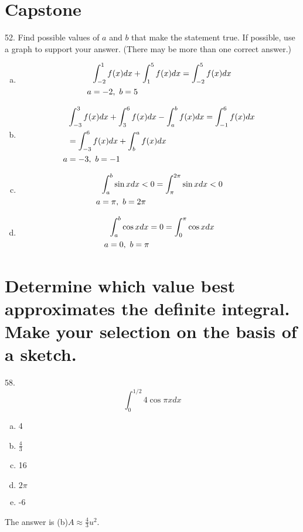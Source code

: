 \documentclass[11pt]{article}
\newcommand*{\set}{\setcounter{equation}{0}}
\begin{document}
\section{Capstone}
52. Find possible values of $a$ and $b$ that make the statement
true. If possible, use a graph to support your answer. (There
may be more than one correct answer.)
\begin{enumerate}[(a)]
    \item
        \begin{align}
            \set
            &\int_{-2}^{1}f(x)dx+\int_{1}^{5}f(x)dx=\int_{-2}^{5}f(x)dx\\
            a&=-2,\,\, b=5
        \end{align}
    \item
        \begin{align}
            \set
            &\int_{-3}^{3}f(x)dx+\int_{3}^{6}f(x)dx-\int_{a}^{b}f(x)dx=\int_{-1}^{6}f(x)dx\\
            &=\int_{-3}^{6}f(x)dx+\int_{b}^{a}f(x)dx\\
            a&=-3,\,\, b=-1
        \end{align}
    \item
        \begin{align}
            \set
            &\int_{a}^{b}\sin xdx<0=\int_{\pi}^{2\pi}\sin xdx<0\\
            a&=\pi,\,\, b=2\pi
        \end{align}
    \item
        \begin{align}
            \set
            &\int_{a}^{b}\cos xdx=0=\int_{0}^{\pi}\cos xdx\\
            a&=0,\,\, b=\pi
        \end{align}
\end{enumerate}

\section{Determine which value best approximates
the definite integral. Make your selection on the basis of a
sketch.}
58.\[\int_{0}^{1/2}4\cos\pi xdx\]
\begin{enumerate}[(a)]
    \item 4
    \item $\frac{4}{3}$
    \item 16
    \item $2\pi$
    \item -6
\end{enumerate}
The answer is (b)$A\approx\frac{4}{3}u^2$.
\end{document}
